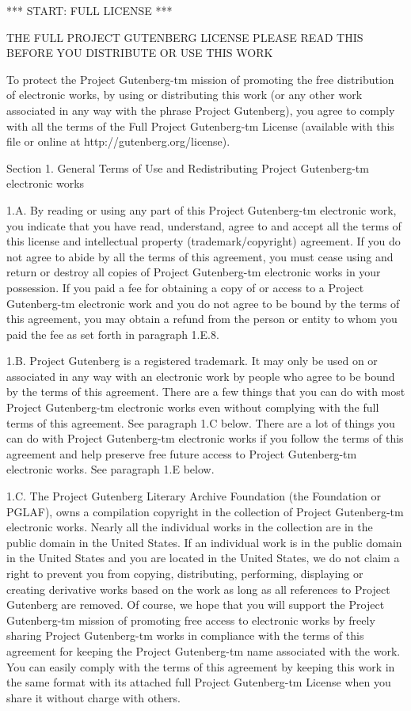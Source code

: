 \documentclass[twocolumn]{article}
\begin{document}
*** START: FULL LICENSE ***

THE FULL PROJECT GUTENBERG LICENSE
PLEASE READ THIS BEFORE YOU DISTRIBUTE OR USE THIS WORK

To protect the Project Gutenberg-tm mission of promoting the free
distribution of electronic works, by using or distributing this work
(or any other work associated in any way with the phrase Project
Gutenberg), you agree to comply with all the terms of the Full Project
Gutenberg-tm License (available with this file or online at
http://gutenberg.org/license).


Section 1.  General Terms of Use and Redistributing Project Gutenberg-tm
electronic works

1.A.  By reading or using any part of this Project Gutenberg-tm
electronic work, you indicate that you have read, understand, agree to
and accept all the terms of this license and intellectual property
(trademark/copyright) agreement.  If you do not agree to abide by all
the terms of this agreement, you must cease using and return or destroy
all copies of Project Gutenberg-tm electronic works in your possession.
If you paid a fee for obtaining a copy of or access to a Project
Gutenberg-tm electronic work and you do not agree to be bound by the
terms of this agreement, you may obtain a refund from the person or
entity to whom you paid the fee as set forth in paragraph 1.E.8.

1.B.  Project Gutenberg is a registered trademark.  It may only be
used on or associated in any way with an electronic work by people who
agree to be bound by the terms of this agreement.  There are a few
things that you can do with most Project Gutenberg-tm electronic works
even without complying with the full terms of this agreement.  See
paragraph 1.C below.  There are a lot of things you can do with Project
Gutenberg-tm electronic works if you follow the terms of this agreement
and help preserve free future access to Project Gutenberg-tm electronic
works.  See paragraph 1.E below.

1.C.  The Project Gutenberg Literary Archive Foundation (the Foundation
or PGLAF), owns a compilation copyright in the collection of Project
Gutenberg-tm electronic works.  Nearly all the individual works in the
collection are in the public domain in the United States.  If an
individual work is in the public domain in the United States and you are
located in the United States, we do not claim a right to prevent you from
copying, distributing, performing, displaying or creating derivative
works based on the work as long as all references to Project Gutenberg
are removed.  Of course, we hope that you will support the Project
Gutenberg-tm mission of promoting free access to electronic works by
freely sharing Project Gutenberg-tm works in compliance with the terms of
this agreement for keeping the Project Gutenberg-tm name associated with
the work.  You can easily comply with the terms of this agreement by
keeping this work in the same format with its attached full Project
Gutenberg-tm License when you share it without charge with others.
\end{document}
